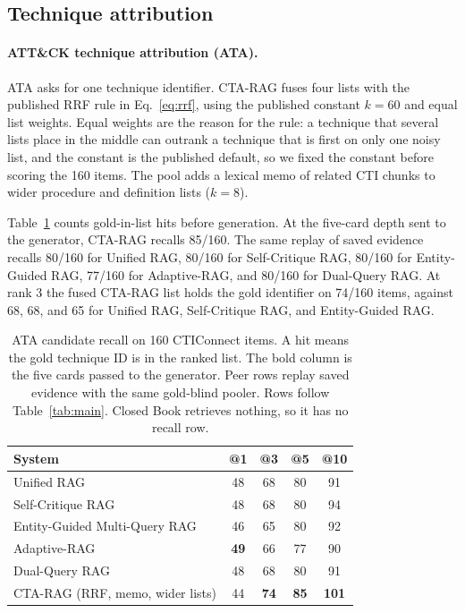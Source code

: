 \documentclass[5p,times,authoryear]{elsarticle}
\begin{document}
\subsection{Technique attribution}
\label{sec:ata-results}

\paragraph{ATT\&CK technique attribution (ATA).}
ATA asks for one technique identifier. CTA-RAG fuses four lists with the published RRF rule in Eq.~\eqref{eq:rrf}, using the published constant $k{=}60$ and equal list weights. Equal weights are the reason for the rule: a technique that several lists place in the middle can outrank a technique that is first on only one noisy list, and the constant is the published default, so we fixed the constant before scoring the 160 items. The pool adds a lexical memo of related CTI chunks to wider procedure and definition lists ($k{=}8$).

Table~\ref{tab:ata-retrieval} counts gold-in-list hits before generation. At the five-card depth sent to the generator, CTA-RAG recalls 85/160. The same replay of saved evidence recalls 80/160 for Unified RAG, 80/160 for Self-Critique RAG, 80/160 for Entity-Guided RAG, 77/160 for Adaptive-RAG, and 80/160 for Dual-Query RAG. At rank 3 the fused CTA-RAG list holds the gold identifier on 74/160 items, against 68, 68, and 65 for Unified RAG, Self-Critique RAG, and Entity-Guided RAG.

\begin{table}[t]
\centering
\small
\caption{ATA candidate recall on 160 CTIConnect items. A hit means the gold technique ID is in the ranked list. The bold column is the five cards passed to the generator. Peer rows replay saved evidence with the same gold-blind pooler. Rows follow Table~\ref{tab:main}. Closed Book retrieves nothing, so it has no recall row.}
\label{tab:ata-retrieval}
\begin{tabular}{@{}lcccc@{}}
\toprule
System & @1 & @3 & \textbf{@5} & @10 \\
\midrule
Unified RAG & 48 & 68 & 80 & 91 \\
Self-Critique RAG & 48 & 68 & 80 & 94 \\
Entity-Guided Multi-Query RAG & 46 & 65 & 80 & 92 \\
Adaptive-RAG & \textbf{49} & 66 & 77 & 90 \\
Dual-Query RAG & 48 & 68 & 80 & 91 \\
CTA-RAG (RRF, memo, wider lists) & 44 & \cellcolor{ctagood}\textbf{74} & \cellcolor{ctagood}\textbf{85} & \cellcolor{ctagood}\textbf{101} \\
\bottomrule
\end{tabular}
\end{table}
\end{document}
